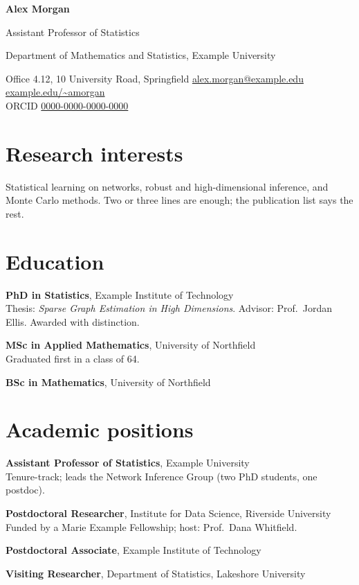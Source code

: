 \documentclass[11pt,a4paper]{article}
\newcommand*{\myname}{Alex Morgan}   %
\begin{document}
{\Huge\bfseries\color{accent} \myname}\par\smallskip
{\large Assistant Professor of Statistics}\par
Department of Mathematics and Statistics, Example University\par\medskip
\small
Office 4.12, 10 University Road, Springfield \quad
\href{mailto:alex.morgan@example.edu}{alex.morgan@example.edu} \quad
\href{https://example.edu/~amorgan}{example.edu/\textasciitilde amorgan}\\
ORCID \href{https://orcid.org/0000-0000-0000-0000}{0000-0000-0000-0000}
\normalsize

\section{Research interests}
Statistical learning on networks, robust and high-dimensional inference, and Monte Carlo
methods. Two or three lines are enough; the publication list says the rest.

\section{Education}
\begin{cvlist}
  \item[2015--2019] \textbf{PhD in Statistics}, Example Institute of Technology\\
    Thesis: \emph{Sparse Graph Estimation in High Dimensions}. Advisor: Prof.\ Jordan Ellis.
    Awarded with distinction.
  \item[2013--2015] \textbf{MSc in Applied Mathematics}, University of Northfield\\
    Graduated first in a class of 64.
  \item[2010--2013] \textbf{BSc in Mathematics}, University of Northfield
\end{cvlist}

\section{Academic positions}
\begin{cvlist}
  \item[2023--present] \textbf{Assistant Professor of Statistics}, Example University\\
    Tenure-track; leads the Network Inference Group (two PhD students, one postdoc).
  \item[2021--2023] \textbf{Postdoctoral Researcher}, Institute for Data Science, Riverside University\\
    Funded by a Marie Example Fellowship; host: Prof.\ Dana Whitfield.
  \item[2019--2021] \textbf{Postdoctoral Associate}, Example Institute of Technology
  \item[Spring 2018] \textbf{Visiting Researcher}, Department of Statistics, Lakeshore University
\end{cvlist}
\end{document}
